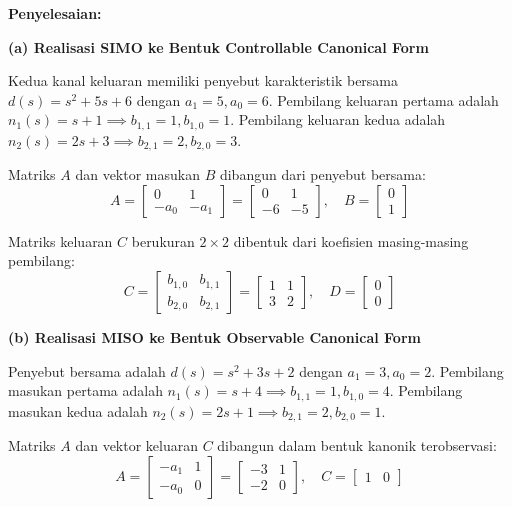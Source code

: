 \documentclass[11pt,a4paper]{article}
\begin{document}
\textbf{Penyelesaian:}

\textbf{(a) Realisasi SIMO ke Bentuk Controllable Canonical Form}

Kedua kanal keluaran memiliki penyebut karakteristik bersama $d(s) = s^2 + 5s + 6$ dengan $a_1 = 5, a_0 = 6$.
Pembilang keluaran pertama adalah $n_1(s) = s + 1 \implies b_{1,1} = 1, b_{1,0} = 1$.
Pembilang keluaran kedua adalah $n_2(s) = 2s + 3 \implies b_{2,1} = 2, b_{2,0} = 3$.

Matriks $A$ dan vektor masukan $B$ dibangun dari penyebut bersama:
$$A = \begin{bmatrix} 0 & 1 \\ -a_0 & -a_1 \end{bmatrix} = \begin{bmatrix} 0 & 1 \\ -6 & -5 \end{bmatrix}, \quad B = \begin{bmatrix} 0 \\ 1 \end{bmatrix}$$

Matriks keluaran $C$ berukuran $2 \times 2$ dibentuk dari koefisien masing-masing pembilang:
$$C = \begin{bmatrix} b_{1,0} & b_{1,1} \\ b_{2,0} & b_{2,1} \end{bmatrix} = \begin{bmatrix} 1 & 1 \\ 3 & 2 \end{bmatrix}, \quad D = \begin{bmatrix} 0 \\ 0 \end{bmatrix}$$

\textbf{(b) Realisasi MISO ke Bentuk Observable Canonical Form}

Penyebut bersama adalah $d(s) = s^2 + 3s + 2$ dengan $a_1 = 3, a_0 = 2$.
Pembilang masukan pertama adalah $n_1(s) = s + 4 \implies b_{1,1} = 1, b_{1,0} = 4$.
Pembilang masukan kedua adalah $n_2(s) = 2s + 1 \implies b_{2,1} = 2, b_{2,0} = 1$.

Matriks $A$ dan vektor keluaran $C$ dibangun dalam bentuk kanonik terobservasi:
$$A = \begin{bmatrix} -a_1 & 1 \\ -a_0 & 0 \end{bmatrix} = \begin{bmatrix} -3 & 1 \\ -2 & 0 \end{bmatrix}, \quad C = \begin{bmatrix} 1 & 0 \end{bmatrix}$$
\end{document}
